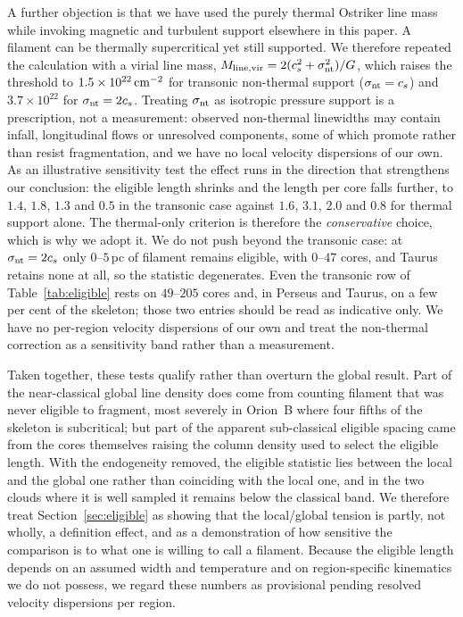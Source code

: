 \documentclass[usenatbib,twoside,twocolumn]{mnras}
\begin{document}
A further objection is that we have used the purely thermal Ostriker line mass while invoking magnetic and turbulent support elsewhere in this paper. A filament can be thermally supercritical yet still supported. We therefore repeated the calculation with a virial line mass, $M_{\rm line,vir}=2(c_s^2+\sigma_{\rm nt}^2)/G$, which raises the threshold to $1.5\times10^{22}\,{\rm cm^{-2}}$ for transonic non-thermal support ($\sigma_{\rm nt}=c_s$) and $3.7\times10^{22}$ for $\sigma_{\rm nt}=2c_s$. Treating $\sigma_{\rm nt}$ as isotropic pressure support is a prescription, not a measurement: observed non-thermal linewidths may contain infall, longitudinal flows or unresolved components, some of which promote rather than resist fragmentation, and we have no local velocity dispersions of our own. As an illustrative sensitivity test the effect runs in the direction that strengthens our conclusion: the eligible length shrinks and the length per core falls further, to $1.4$, $1.8$, $1.3$ and $0.5$ in the transonic case against $1.6$, $3.1$, $2.0$ and $0.8$ for thermal support alone. The thermal-only criterion is therefore the \emph{conservative} choice, which is why we adopt it. We do not push beyond the transonic case: at $\sigma_{\rm nt}=2c_s$ only $0$--$5$\,pc of filament remains eligible, with $0$--$47$ cores, and Taurus retains none at all, so the statistic degenerates. Even the transonic row of Table~\ref{tab:eligible} rests on $49$--$205$ cores and, in Perseus and Taurus, on a few per cent of the skeleton; those two entries should be read as indicative only. We have no per-region velocity dispersions of our own and treat the non-thermal correction as a sensitivity band rather than a measurement.

Taken together, these tests qualify rather than overturn the global result. Part of the near-classical global line density does come from counting filament that was never eligible to fragment, most severely in Orion~B where four fifths of the skeleton is subcritical; but part of the apparent sub-classical eligible spacing came from the cores themselves raising the column density used to select the eligible length. With the endogeneity removed, the eligible statistic lies between the local and the global one rather than coinciding with the local one, and in the two clouds where it is well sampled it remains below the classical band. We therefore treat Section~\ref{sec:eligible} as showing that the local/global tension is partly, not wholly, a definition effect, and as a demonstration of how sensitive the comparison is to what one is willing to call a filament. Because the eligible length depends on an assumed width and temperature and on region-specific kinematics we do not possess, we regard these numbers as provisional pending resolved velocity dispersions per region.
\end{document}
